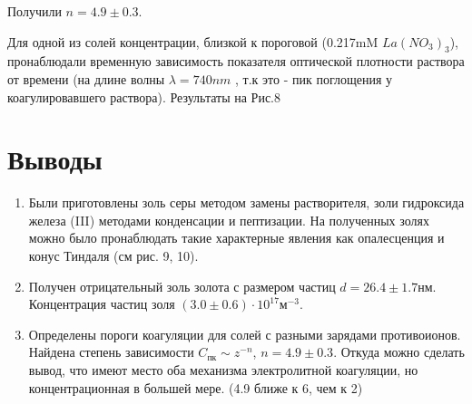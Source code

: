 \documentclass[a4paper, 12pt]{article}
\begin{document}
Получили $n = 4.9 \pm 0.3$. 

Для одной из солей концентрации, близкой к пороговой (0.217mM $La(NO_{3})_{3}$), пронаблюдали временную зависимость показателя оптической плотности раствора от времени (на длине волны $\lambda = 740nm$ , т.к это - пик поглощения у коагулировавшего раствора). Результаты на Рис.8  
\newpage
 \section{Выводы}
\begin{enumerate}
    \item Были приготовлены золь серы методом замены растворителя, золи гидроксида железа (III) методами конденсации и пептизации. На полученных золях можно было пронаблюдать такие характерные явления как опалесценция и конус Тиндаля (см рис. 9, 10).
    \item Получен отрицательный золь золота с размером частиц $d = 26.4\pm1.7$нм. Концентрация частиц золя $(3.0\pm 0.6)\cdot 10^{17} \text{м}^{-3}$.
    \item Определены пороги коагуляции для солей с разными зарядами противоионов. Найдена степень зависимости $C_{\text{пк}} \sim z^{-n}$, $n=4.9 \pm 0.3$. Откуда можно сделать вывод, что имеют место оба механизма электролитной коагуляции, но концентрационная в большей мере. (4.9 ближе к 6, чем к 2)

\end{enumerate}
\end{document}

